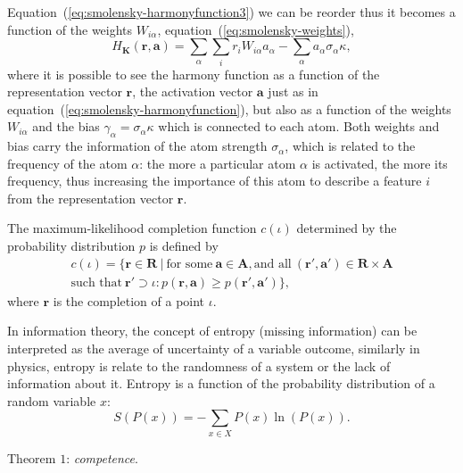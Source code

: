 Equation~(\ref{eq:smolensky-harmonyfunction3}) we can be reorder thus it becomes a function of the weights $W_{i \alpha}$, equation~(\ref{eq:smolensky-weights}),
\begin{equation}
    \label{eq:smolensky-harmonyfunctionfinal}
    H_{\mathbf{K}}(\mathbf{r}, \mathbf{a}) = \sum_{\alpha} \sum_{i} r_{i} W_{i \alpha} a_{\alpha} - \sum_{\alpha} a_{\alpha} \sigma_{\alpha} \kappa,
\end{equation}
where it is possible to see the harmony function as a function of the representation vector $\mathbf{r}$, the activation vector $\mathbf{a}$ just as in equation~(\ref{eq:smolensky-harmonyfunction}), but also as a function of the weights $W_{i \alpha}$ and the bias $\gamma_{\alpha} = \sigma_{\alpha} \kappa$ which is connected to each atom.
Both weights and bias carry the information of the atom strength $\sigma_{\alpha}$, which is related to the frequency of the atom $\alpha$: the more a particular atom $\alpha$ is activated, the more its frequency, thus increasing the importance of this atom to describe a feature $i$ from the representation vector $\mathbf{r}$.


The maximum-likelihood completion function $c(\iota)$ determined by the probability distribution $p$ is defined by
\begin{equation}
    \label{eq:smolensky-maxcompletion}
    \begin{split}
        c(\iota) = \{\mathbf{r} \in \mathbf{R} \: | \: \text{for some} \: \mathbf{a} \in \mathbf{A}, \text{and all} \: (\mathbf{r}', \mathbf{a}') \in \mathbf{R} \times \mathbf{A} \\
        \text{such that} \: \mathbf{r}' \supset \iota: p(\mathbf{r}, \mathbf{a}) \geqslant p(\mathbf{r}', \mathbf{a}') \},
   \end{split}
\end{equation}
where $\mathbf{r}$ is the completion of a point $\iota$.

In information theory, the concept of entropy (missing information) can be interpreted as the average of uncertainty of a variable outcome, similarly in physics, entropy is relate to the randomness of a system or the lack of information about it.
Entropy is a function of the probability distribution of a random variable $x$:
\begin{equation}
    \label{eq:smolensky-entropy}
    S(P(x)) = - \sum_{x \in X} P(x) \ln{(P(x))}.
\end{equation}

Theorem $1$: \textit{competence}.

